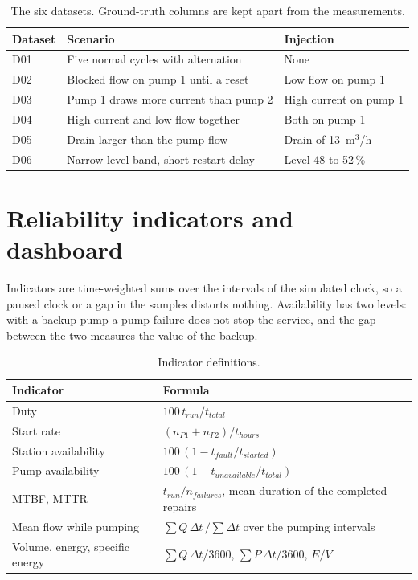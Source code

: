 \documentclass[11pt,a4paper]{report}
\begin{document}
	\begin{table}[H]\centering\small
		\begin{tabularx}{\linewidth}{|l|Y|Y|}
			\hline
			Dataset & Scenario & Injection \\
			\hline
			D01 & Five normal cycles with alternation & None \\
			D02 & Blocked flow on pump 1 until a reset & Low flow on pump 1 \\
			D03 & Pump 1 draws more current than pump 2 & High current on pump 1 \\
			D04 & High current and low flow together & Both on pump 1 \\
			D05 & Drain larger than the pump flow & Drain of 13~m$^3$/h \\
			D06 & Narrow level band, short restart delay & Level 48 to 52\,\% \\
			\hline
		\end{tabularx}
		\caption{The six datasets. Ground-truth columns are kept apart from the measurements.}\label{tab:datasets}
	\end{table}
	
	\section{Reliability indicators and dashboard}
	
	Indicators are time-weighted sums over the intervals of the simulated clock, so a paused clock or a gap in the samples distorts nothing. Availability has two levels: with a backup pump a pump failure does not stop the service, and the gap between the two measures the value of the backup.
	
	\begin{table}[H]\centering\small
		\begin{tabularx}{\linewidth}{|l|Y|}
			\hline
			Indicator & Formula \\
			\hline
			Duty & $100\,t_{run}/t_{total}$ \\
			Start rate & $(n_{P1}+n_{P2})/t_{hours}$ \\
			Station availability & $100\,(1-t_{fault}/t_{started})$ \\
			Pump availability & $100\,(1-t_{unavailable}/t_{total})$ \\
			MTBF, MTTR & $t_{run}/n_{failures}$, mean duration of the completed repairs \\
			Mean flow while pumping & $\sum Q\,\Delta t\,/\sum \Delta t$ over the pumping intervals \\
			Volume, energy, specific energy & $\sum Q\,\Delta t/3600$, $\sum P\,\Delta t/3600$, $E/V$ \\
			\hline
		\end{tabularx}
		\caption{Indicator definitions.}\label{tab:kpi}
	\end{table}
	
\end{document}
